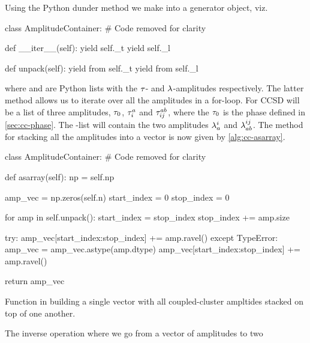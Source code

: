             Using the Python dunder method  we make
             into a generator object, viz.
            \begin{python}
class AmplitudeContainer:
    # Code removed for clarity

    def __iter__(self):
        yield self._t
        yield self._l

    def unpack(self):
        yield from self._t
        yield from self._l
            \end{python}
            where  and  are Python lists with the
            $\tau$- and $\lambda$-amplitudes respectively.
            The latter method  allows us to iterate over all the
            amplitudes in a for-loop.
            For CCSD  will be a list of three amplitudes,
            $\tau_0$, $\tau^{a}_{i}$ and $\tau^{ab}_{ij}$, where
            the $\tau_0$ is the phase defined in \autoref{sec:cc-phase}.
            The -list will contain the two amplitudes
            $\lambda^{i}_{a}$ and $\lambda^{ij}_{ab}$.
            The method for stacking all the amplitudes into a vector is now
            given by \autoref{alg:cc-asarray}.
            \begin{algorithm}
                \begin{python}
class AmplitudeContainer:
    # Code removed for clarity

    def asarray(self):
        np = self.np

        amp_vec = np.zeros(self.n)
        start_index = 0
        stop_index = 0

        for amp in self.unpack():
            start_index = stop_index
            stop_index += amp.size

            try:
                amp_vec[start_index:stop_index] += amp.ravel()
            except TypeError:
                amp_vec = amp_vec.astype(amp.dtype)
                amp_vec[start_index:stop_index] += amp.ravel()

        return amp_vec
                \end{python}
                \caption{Function in  building a single
                vector with all coupled-cluster ampltides stacked on top of one
                another.}
                \label{alg:cc-asarray}
            \end{algorithm}
            The inverse operation where we go from a vector of amplitudes to two
